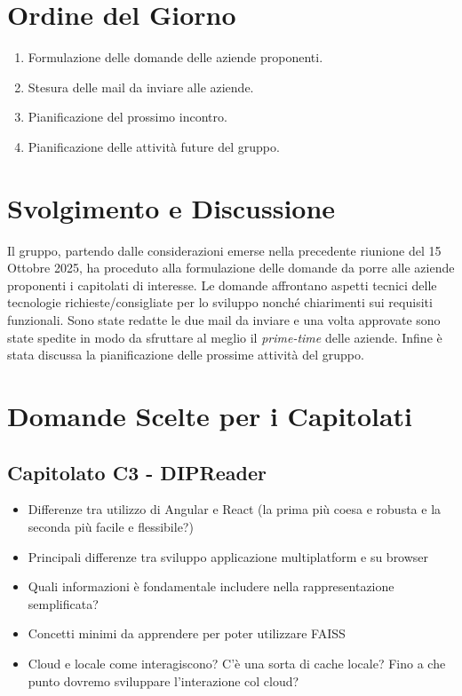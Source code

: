 \documentclass[a4paper,12pt]{article}
\begin{document}
\section{Ordine del Giorno}
\begin{enumerate}
    \item Formulazione delle domande delle aziende proponenti.
    \item Stesura delle mail da inviare alle aziende.
    \item Pianificazione del prossimo incontro.
    \item Pianificazione delle attività future del gruppo.
\end{enumerate}
\vspace{0.5cm}
\section{Svolgimento e Discussione}
Il gruppo, partendo dalle considerazioni emerse nella precedente riunione del
15 Ottobre 2025, ha proceduto alla formulazione delle domande da porre alle
aziende proponenti i capitolati di interesse. Le domande affrontano aspetti
tecnici delle tecnologie richieste/consigliate per lo sviluppo nonché
chiarimenti sui requisiti funzionali. Sono state redatte le due mail da inviare
e una volta approvate sono state spedite in modo da sfruttare al meglio il
\textit{prime-time} delle aziende. Infine è stata discussa la pianificazione
delle prossime attività del gruppo.

\vspace{0.5cm}
\section{Domande Scelte per i Capitolati}

\subsection{Capitolato C3 - DIPReader}
\begin{itemize}
    \item Differenze tra utilizzo di Angular e React (la prima più coesa e robusta e la
          seconda più facile e flessibile?)
    \item Principali differenze tra sviluppo applicazione multiplatform e su browser
    \item Quali informazioni è fondamentale includere nella rappresentazione
          semplificata?
    \item Concetti minimi da apprendere per poter utilizzare FAISS
    \item Cloud e locale come interagiscono? C'è una sorta di cache locale? Fino a che
          punto dovremo sviluppare l'interazione col cloud?
\end{itemize}
\end{document}
